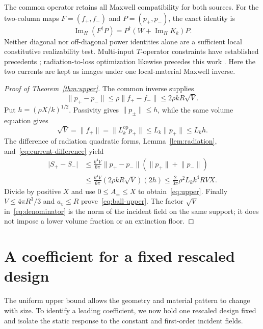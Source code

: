 \documentclass[11pt]{article}
\newcommand{\ImH}{\operatorname{Im}_{\!H}}
\newcommand{\norm}[1]{\lVert #1\rVert}
\newcommand{\abs}[1]{\lvert #1\rvert}
\begin{document}
The common operator retains all Maxwell compatibility for both sources. For the two-column maps $F=(f_+,f_-)$ and $P=(p_+,p_-)$, the exact identity is
\begin{equation}\label{eq:joint}
 \ImH(F^\dagger P)=P^\dagger(W+\ImH K_k)P.
\end{equation}
Neither diagonal nor off-diagonal power identities alone are a sufficient local constitutive realizability test. Multi-input $T$-operator constraints have established precedents \citep{Molesky2022}; radiation-to-loss optimization likewise precedes this work \citep{Schab2020}. Here the two currents are kept as images under one local-material Maxwell inverse.

\begin{proof}[Proof of Theorem~\ref{thm:upper}]
The common inverse supplies
\begin{equation}\label{eq:current-difference}
 \norm{p_+-p_-}\leq\rho\norm{f_+-f_-}
  \leq2\rho kR\sqrt V.
\end{equation}
Put $h=(\rho X/k)^{1/2}$. Passivity gives $\norm{p_\pm}\leq h$, while the same volume equation gives
\begin{equation}\label{eq:denominator}
 \sqrt V=\norm{f_+}=\norm{L_k^{\mathrm{op}}p_+}
  \leq L_k\norm{p_+}\leq L_kh.
\end{equation}
The difference of radiation quadratic forms, Lemma~\ref{lem:radiation}, and~\eqref{eq:current-difference} yield
\begin{align*}
 \abs{S_+-S_-}
 &\leq\frac{k^4V}{6\pi}\norm{p_+-p_-}
       (\norm{p_+}+\norm{p_-})\\
 &\leq\frac{k^4V}{6\pi}(2\rho kR\sqrt V)(2h)
 \leq\frac{2}{3\pi}\rho^2L_k k^4RVX.
\end{align*}
Divide by positive $X$ and use $0\leq A_\pm\leq X$ to obtain~\eqref{eq:upper}. Finally $V\leq4\pi R^3/3$ and $a_v\leq R$ prove~\eqref{eq:ball-upper}. The factor $\sqrt V$ in~\eqref{eq:denominator} is the norm of the incident field on the same support; it does not impose a lower volume fraction or an extinction floor.
\end{proof}

\section{A coefficient for a fixed rescaled design}\label{sec:coefficient}
The uniform upper bound allows the geometry and material pattern to change with size. To identify a leading coefficient, we now hold one rescaled design fixed and isolate the static response to the constant and first-order incident fields.
\end{document}
